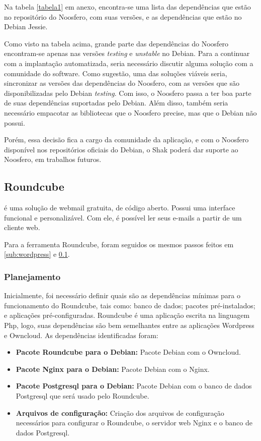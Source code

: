 Na tabela \ref{tabela1} em anexo, encontra-se uma lista das dependências 
que estão no repositório do Noosfero,
com suas versões, e as dependências que estão no Debian Jessie.

Como visto na tabela acima, grande parte das dependências do Noosfero encontram-se
 apenas nas versões \textit{testing} e \textit{unstable} no Debian. Para a continuar com
a implantação automatizada, seria necessário discutir alguma solução 
com a comunidade do software. Como sugestão, uma das soluções viáveis seria, 
sincronizar as versões das dependências do Noosfero, com as versões que são 
disponibilizadas pelo Debian \textit{testing}. Com isso, o 
Noosfero passa a ter boa parte de suas dependências suportadas pelo Debian. Além disso, 
também seria necessário empacotar as bibliotecas que o Noosfero precise, mas 
que o Debian não possui. 

Porém, essa decisão fica a cargo da comunidade da aplicação, e com o Noosfero disponível
nos repositórios oficiais do Debian, o Shak poderá dar suporte ao Noosfero, 
em trabalhos futuros.

 \subsection{Roundcube}
\label{sub:owncloud}

 é uma solução de webmail gratuita, de código 
aberto. Possui uma interface funcional e personalizável. Com ele, é possível
ler seus e-mails a partir de um cliente web. 

Para a ferramenta Roundcube, foram seguidos os mesmos passos feitos em 
\ref{sub:wordpress} e \ref{sub:owncloud}.

\subsubsection{Planejamento}

Inicialmente, foi necessário definir quais são as dependências
mínimas para o funcionamento do Roundcube, tais como: banco de dados; pacotes
pré-instalados; e aplicações pré-configuradas. Roundcube é uma aplicação escrita
na linguagem Php, logo, suas dependências são bem semelhantes entre as aplicações
Wordpress e Owncloud. As dependências identificadas foram:

\begin{itemize}
   \item \textbf{Pacote Roundcube para o Debian:} Pacote Debian com o Owncloud.
   \item \textbf{Pacote Nginx para o Debian:} Pacote Debian com o Nginx.
   \item \textbf{Pacote Postgresql para o Debian:} Pacote Debian com o banco de dados Postgresql
   que será usado pelo Roundcube.
   \item \textbf{Arquivos de configuração:} Criação dos arquivos de configuração
   necessários para configurar o Roundcube, o servidor web Nginx e o banco de dados
   Postgresql.
\end{itemize}

